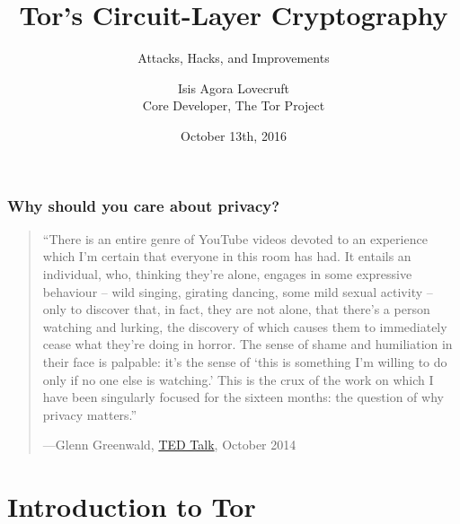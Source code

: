 \documentclass[9pt,a4paper]{beamer}
\title{Tor's Circuit-Layer Cryptography}
\subtitle{Attacks, Hacks, and Improvements}
\author{Isis Agora Lovecruft \\
  Core Developer, The Tor Project
}
\date{\vspace{3mm} October 13th, 2016}
\institute{University of Waterloo}
\begin{document}
\maketitle


\begin{frame}
  \frametitle{Why should you care about privacy?}
  \begin{quotation}
    ``There is an entire genre of YouTube videos devoted to an experience which
    I'm certain that everyone in this room has had. It entails an individual,
    who, thinking they're alone, engages in some expressive behaviour -- wild
    singing, girating dancing, some mild sexual activity -- only to discover
    that, in fact, they are not alone, that there's a person watching and
    lurking, the discovery of which causes them to immediately cease what
    they're doing in horror. The sense of shame and humiliation in their face is
    palpable: it's the sense of `this is something I'm willing to do only if no
    one else is watching.'  This is the crux of the work on which I have been
    singularly focused for the sixteen months: the question of why privacy matters.'' \\
    \hfill{\raggedright---Glenn Greenwald,
      \href{https://www.youtube.com/watch?v=pcSlowAhvUk}{TED Talk}, October 2014}
  \end{quotation}
\end{frame}


\section{Introduction to Tor}
\end{document}
